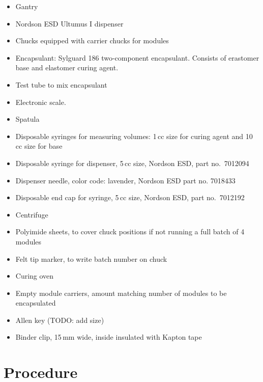 \documentclass[12pt]{unlsilabsop}
\begin{document}
\begin{itemize}
    \item Gantry
    \item Nordson ESD Ultumus I dispenser
    \item Chucks equipped with carrier chucks for modules
    \item Encapsulant: Sylguard 186 two-component encapsulant. Consists of erastomer base and elastomer curing agent.
    \item Test tube to mix encapsulant
    \item Electronic scale.
    \item Spatula
    \item Disposable syringes for measuring volumes: 1\,cc size for curing agent and 10\,cc size for base
    \item Disposable syringe for dispenser, 5\,cc size, Nordson ESD, part no.~7012094
    \item Dispenser needle, color code: lavender, Nordson ESD part no. 7018433
    \item Disposable end cap for syringe, 5\,cc size, Nordson ESD, part no.~7012192
    \item Centrifuge
    \item Polyimide sheets, to cover chuck positions if not running a full batch of 4 modules
    \item Felt tip marker, to write batch number on chuck
    \item Curing oven
    \item Empty module carriers, amount matching number of modules to be encapsulated
    \item Allen key (TODO: add size)
    \item Binder clip, 15\,mm wide, inside insulated with Kapton tape
\end{itemize}

\section{Procedure}
\end{document}

